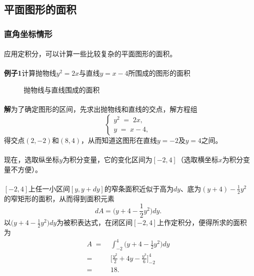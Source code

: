 \subsection{平面图形的面积}
\subsubsection{直角坐标情形}
\paragraph{}
应用定积分，可以计算一些比较复杂的平面图形的面积。

\paragraph{}
\textbf{例子1\;}计算抛物线$y^2=2x$与直线$y=x-4$所围成的图形的面积

\begin{figure}[H]
\centering
  
  \caption{抛物线与直线围成的面积}
\end{figure}

\paragraph{}
\textbf{解\;}为了确定图形的区间，先求出抛物线和直线的交点，解方程组
\begin{equation*}
  \left\{ \begin{array}{l}
    y^2 \;=\; 2x, \\
    y \;=\; x - 4,
  \end{array} \right.
\end{equation*}
得交点$(2,-2)$和$(8,4)$，从而知道这图形在直线$y=-2$及$y=4$之间。

\paragraph{}
现在，选取纵坐标$y$为积分变量，它的变化区间为$[-2,4]$（选取横坐标$x$为积分变量不方便）。

\paragraph{}
$[-2,4]$上任一小区间$[y,y+dy]$的窄条面积近似于高为$dy$、底为$\displaystyle(y+4)-\frac{1}{2}y^2$的窄矩形的面积，从而得到面积元素
\begin{equation*}
  dA = \big( y+4-\frac{1}{2}y^2 \big)dy.
\end{equation*}
以$\displaystyle\big( y+4-\frac{1}{2}y^2 \big)dy$为被积表达式，在闭区间$[-2,4]$上作定积分，便得所求的面积为
\begin{align*}
  A \;=&\; \int_{-2}^4\big( y+4-\frac{1}{2}y^2 \big)dy \\
  =&\; \big[ \frac{y^2}{2} + 4y - \frac{y^3}{6} \big]_{-2}^4 \\
  =&\; 18.
\end{align*}

